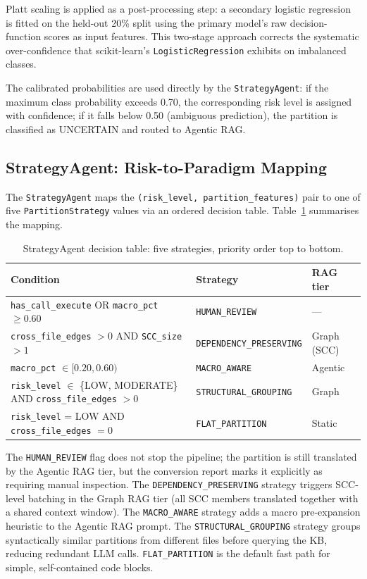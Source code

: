 Platt scaling is applied as a post-processing step: a secondary logistic
regression is fitted on the held-out 20\% split using the primary model's raw
decision-function scores as input features. This two-stage approach corrects
the systematic over-confidence that scikit-learn's \texttt{LogisticRegression}
exhibits on imbalanced classes.

The calibrated probabilities are used directly by the \texttt{StrategyAgent}:
if the maximum class probability exceeds 0.70, the corresponding risk level is
assigned with confidence; if it falls below 0.50 (ambiguous prediction), the
partition is classified as UNCERTAIN and routed to Agentic RAG.

\subsection{StrategyAgent: Risk-to-Paradigm Mapping}
\label{subsec:strategy-impl}

The \texttt{StrategyAgent} maps the \texttt{(risk\_level, partition\_features)}
pair to one of five \texttt{PartitionStrategy} values via an ordered decision
table. Table~\ref{tab:strategy-rules} summarises the mapping.

\begin{table}[h]
\centering
\caption{StrategyAgent decision table: five strategies, priority order top to bottom.}
\label{tab:strategy-rules}
\begin{tabular}{lll}
\hline
\textbf{Condition} & \textbf{Strategy} & \textbf{RAG tier} \\
\hline
\texttt{has\_call\_execute} OR \texttt{macro\_pct} $\geq 0.60$ & \texttt{HUMAN\_REVIEW} & — \\
\texttt{cross\_file\_edges} $> 0$ AND \texttt{SCC\_size} $> 1$ & \texttt{DEPENDENCY\_PRESERVING} & Graph (SCC) \\
\texttt{macro\_pct} $\in [0.20, 0.60)$ & \texttt{MACRO\_AWARE} & Agentic \\
\texttt{risk\_level} $\in$ \{LOW, MODERATE\} AND \texttt{cross\_file\_edges} $> 0$ & \texttt{STRUCTURAL\_GROUPING} & Graph \\
\texttt{risk\_level} = LOW AND \texttt{cross\_file\_edges} $= 0$ & \texttt{FLAT\_PARTITION} & Static \\
\hline
\end{tabular}
\end{table}

The \texttt{HUMAN\_REVIEW} flag does not stop the pipeline; the partition is
still translated by the Agentic RAG tier, but the conversion report marks it
explicitly as requiring manual inspection. The \texttt{DEPENDENCY\_PRESERVING}
strategy triggers SCC-level batching in the Graph RAG tier (all SCC members
translated together with a shared context window). The \texttt{MACRO\_AWARE}
strategy adds a macro pre-expansion heuristic to the Agentic RAG prompt. The
\texttt{STRUCTURAL\_GROUPING} strategy groups syntactically similar partitions
from different files before querying the KB, reducing redundant LLM calls.
\texttt{FLAT\_PARTITION} is the default fast path for simple, self-contained
code blocks.


